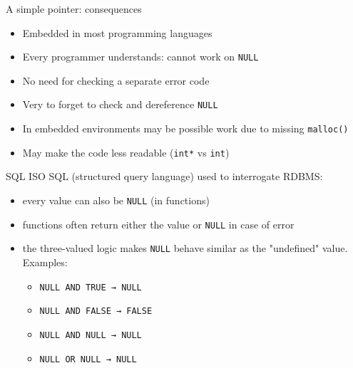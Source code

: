 \documentclass[aspectratio=169,14pt]{beamer}
\begin{document}
\begin{frame}[fragile]{A simple pointer: consequences}
\begin{itemize}
    \item[\good] Embedded in most programming languages
    \item[\good] Every programmer understands: cannot work on \texttt{NULL}
    \item[\good] No need for checking a separate error code
    \item[\bad] Very to forget to check and dereference \texttt{NULL}
    \item[\meh] In embedded environments may be possible work due to missing \texttt{malloc()}
    \item[\meh] May make the code less readable (\texttt{int*} vs \texttt{int})
\end{itemize}
\end{frame}



\begin{frame}{SQL}
ISO SQL (structured query language) used to interrogate RDBMS:
\begin{itemize}
    \item every value can also be \texttt{NULL} (in functions)
    \item functions often return either the value or \texttt{NULL} in case of error
    \item the three-valued logic makes \texttt{NULL} behave similar as the "undefined" value. Examples:
    \begin{itemize}
        \item \texttt{NULL AND  TRUE → NULL}
        \item \texttt{NULL AND FALSE → FALSE}
        \item \texttt{NULL AND  NULL → NULL}
        \item \texttt{NULL  OR  NULL → NULL}
    \end{itemize}
\end{itemize}
\end{frame}
\end{document}
